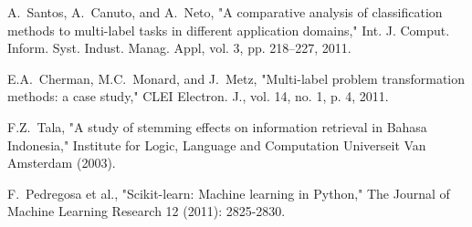 \documentclass[conference]{IEEEtran}
\begin{document}
\begin{thebibliography}{1}
A.~Santos, A.~Canuto, and A.~Neto,
    "A comparative analysis of classification methods to multi-label tasks in different application domains,"
    Int. J. Comput. Inform. Syst. Indust. Manag. Appl, vol. 3,
    pp. 218–227, 2011.

E.A.~Cherman, M.C.~Monard, and J.~Metz,
    "Multi-label problem transformation methods: a case study,"
    CLEI Electron. J., vol. 14, no. 1, p. 4, 2011.

F.Z.~Tala,
    "A study of stemming effects on information retrieval in Bahasa Indonesia,"
    Institute for Logic, Language and Computation Universeit Van Amsterdam (2003).

F.~Pedregosa et al.,
    "Scikit-learn: Machine learning in Python,"
    The Journal of Machine Learning Research 12 (2011): 2825-2830.

\end{thebibliography}





%
%

\end{document}

